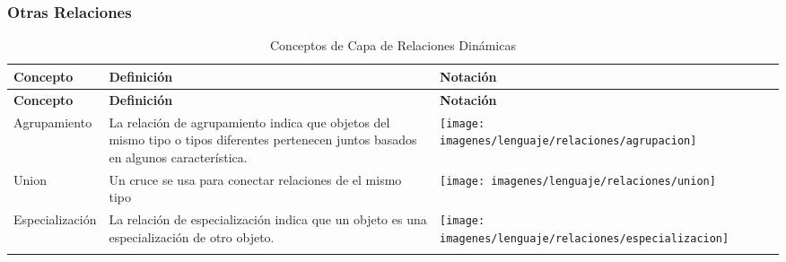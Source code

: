 \subsubsection{Otras Relaciones}
\begin{center}
	\begin{longtable}[h]{| >{\centering\arraybackslash}m{3cm} | >{\arraybackslash}m{6cm} | p{4cm} | p{5cm} | p{4cm} |}
		
		\hline
		\textbf{Concepto} &  \centering \textbf{Definición} & \textbf{Notación} \\
		\hline
		\endfirsthead
		
		
		\hline
		\textbf{Concepto} &  \centering \textbf{Definición} & \textbf{Notación} \\
		\hline
		\endhead
		
		Agrupamiento     
		& \vspace{1mm} La relación de agrupamiento indica que
		objetos del mismo tipo o tipos diferentes
		pertenecen juntos basados en algunos
		característica.   
		&\texttt{[image: imagenes/lenguaje/relaciones/agrupacion]}  \\ \hline
		
		Union
		& \vspace{1mm} Un cruce se usa para conectar relaciones de
		el mismo tipo
		& \texttt{[image: imagenes/lenguaje/relaciones/union]}  \\ \hline
		
		
		
		Especialización
		& \vspace{1mm}La relación de especialización indica que
		un objeto es una especialización de otro objeto.
		& \texttt{[image: imagenes/lenguaje/relaciones/especializacion]}  \\ \hline
		
		
		\caption{Conceptos de Capa de Relaciones Dinámicas}
		
	\end{longtable}
\end{center}
